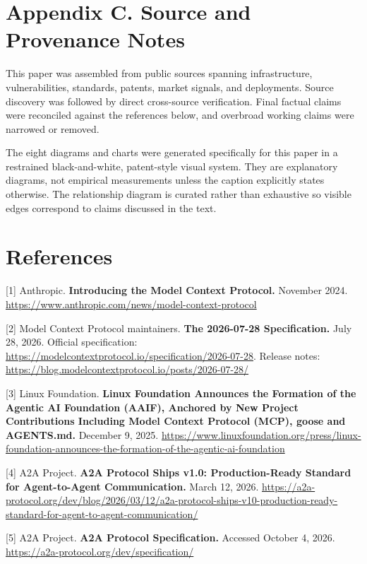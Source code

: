 \documentclass[
  10pt,
  letterpaper,
]{article}
\begin{document}
\section{Appendix C. Source and Provenance
Notes}\label{appendix-c.-source-and-provenance-notes}

This paper was assembled from public sources spanning infrastructure,
vulnerabilities, standards, patents, market signals, and deployments.
Source discovery was followed by direct cross-source verification. Final
factual claims were reconciled against the references below, and
overbroad working claims were narrowed or removed.

The eight diagrams and charts were generated specifically for this paper
in a restrained black-and-white, patent-style visual system. They are
explanatory diagrams, not empirical measurements unless the caption
explicitly states otherwise. The relationship diagram is curated rather
than exhaustive so visible edges correspond to claims discussed in the
text.

\section{References}\label{references}

{[}1{]} Anthropic. \textbf{Introducing the Model Context Protocol.}
November 2024.
\url{https://www.anthropic.com/news/model-context-protocol}

{[}2{]} Model Context Protocol maintainers. \textbf{The 2026-07-28
Specification.} July 28, 2026. Official specification:
\url{https://modelcontextprotocol.io/specification/2026-07-28}. Release
notes: \url{https://blog.modelcontextprotocol.io/posts/2026-07-28/}

{[}3{]} Linux Foundation. \textbf{Linux Foundation Announces the
Formation of the Agentic AI Foundation (AAIF), Anchored by New Project
Contributions Including Model Context Protocol (MCP), goose and
AGENTS.md.} December 9, 2025.
\url{https://www.linuxfoundation.org/press/linux-foundation-announces-the-formation-of-the-agentic-ai-foundation}

{[}4{]} A2A Project. \textbf{A2A Protocol Ships v1.0: Production-Ready
Standard for Agent-to-Agent Communication.} March 12, 2026.
\url{https://a2a-protocol.org/dev/blog/2026/03/12/a2a-protocol-ships-v10-production-ready-standard-for-agent-to-agent-communication/}

{[}5{]} A2A Project. \textbf{A2A Protocol Specification.} Accessed
October 4, 2026. \url{https://a2a-protocol.org/dev/specification/}
\end{document}
